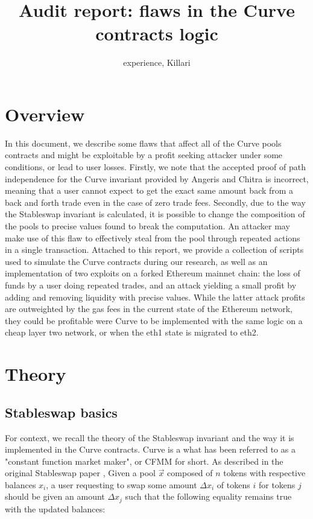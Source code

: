 \documentclass{article}
\title{Audit report: flaws in the Curve contracts logic}
\author{experience, Killari}
\begin{document}
    \maketitle

    \section{Overview}

    In this document, we describe some flaws that affect all of the Curve pools contracts and might be exploitable by a profit seeking attacker under some conditions, or lead to user losses. Firstly, we note that the accepted proof of path independence for the Curve invariant provided by Angeris and Chitra is incorrect, meaning that a user cannot expect to get the exact same amount back from a back and forth trade even in the case of zero trade fees. Secondly, due to the way the Stableswap invariant is calculated, it is possible to change the composition of the pools to precise values found to break the computation. An attacker may make use of this flaw to effectively steal from the pool through repeated actions in a single transaction. Attached to this report, we provide a collection of scripts used to simulate the Curve contracts during our research, as well as an implementation of two exploits on a forked Ethereum mainnet chain: the loss of funds by a user doing repeated trades, and an attack yielding a small profit by adding and removing liquidity with precise values. While the latter attack profits are outweighted by the gas fees in the current state of the Ethereum network, they could be profitable were Curve to be implemented with the same logic on a cheap layer two network, or when the eth1 state is migrated to eth2.

    \section{Theory}

    \subsection{Stableswap basics}

    For context, we recall the theory of the Stableswap invariant and the way it is implemented in the Curve contracts. Curve is a what has been referred to as a "constant function market maker", or CFMM for short. As described in the original Stableswap paper \cite{stableswap2019}, Given a pool $\vec{x}$ composed of $n$ tokens with respective balances $x_{i}$, a user requesting to swap some amount $\Delta x_{i}$ of tokens $i$ for tokens $j$ should be given an amount $\Delta x_{j}$ such that the following equality remains true with the updated balances: 
\end{document}
